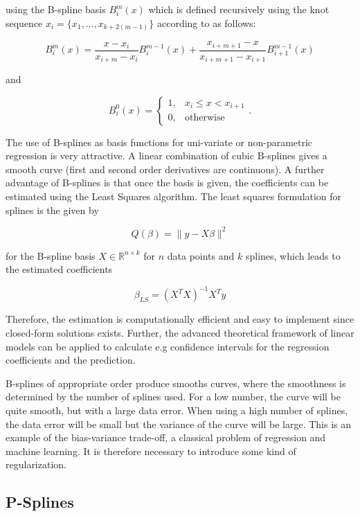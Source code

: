 using the B-spline basis $B_i^m(x)$ which is defined recursively using the knot sequence $x_i = \{x_1, \dots, x_{k+2(m-1)}\}$ according to \cite{deBoor1978practicalGuideToSplines} as follows:

$$B_i^m(x) = \frac{x - x_i}{x_{i+m} - x_i} B_i^{m-1}(x) + \frac{x_{i+m+1} - x}{x_{i+m+1} - x_{i+1}} B_{i+1}^{m-1}(x)$$

and

$$B_i^0(x) = \begin{cases} 1, & x_i \le x < x_{i+1} \\ 0, & \text{otherwise} \end{cases}.$$

The use of B-splines as basis functions for uni-variate or non-parametric regression is very attractive. A linear combination of cubic B-splines gives a smooth curve (first and second order derivatives are continuous). A further advantage of B-splines is that once the basis is given, the coefficients can be estimated using the Least Squares algorithm. The least squares formulation for splines is the given by

$$Q(\beta) = \lVert y - X\beta\rVert^2$$

for the B-spline basis $X \in \mathbb{R}^{n \times k}$ for $n$ data points and $k$ splines, which leads to the estimated coefficients 

$$\beta_{LS} = (X^TX)^{-1}X^T y$$

Therefore, the estimation is computationally efficient and easy to implement since closed-form solutions exists. Further, the advanced theoretical framework of linear models can be applied to calculate e.g confidence intervals for the regression coefficients and the prediction.

B-splines of appropriate order  produce smooths curves, where the smoothness is determined by the number of splines used. For a low number, the curve will be quite smooth, but with a large data error. When using a high number of splines, the data error will be small but the variance of the curve will be large. This is an example of the bias-variance trade-off, a classical problem of regression and machine learning. It is therefore necessary to introduce some kind of regularization. \cite{deBoor1978practicalGuideToSplines}  

\subsection{P-Splines} \label{SubsectionPspline}


